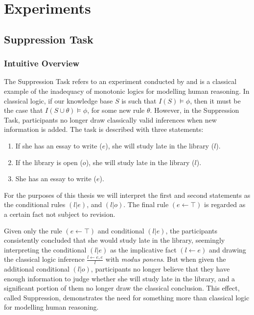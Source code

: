 \chapter{Experiments} \label{chp:experiments}
\section{Suppression Task} \label{sec:sup}
\subsection{Intuitive Overview} \label{ssec:sup_intuition}
The Suppression Task refers to an experiment conducted by \cite{byrne1989suppressing} and is a classical example of the inadequacy of monotonic logics for modelling human reasoning. In classical logic, if our knowledge base $S$ is such that $I(S) \models \phi$, then it must be the case that $I(S \cup \theta) \models \phi$, for some new rule $\theta$. However, in the Suppression Task, participants no longer draw classically valid inferences when new information is added. The task is described with three statements:

\begin{enumerate}
\item If she has an essay to write ($e$), she will study late in the library ($l$).
\item If the library is open ($o$), she will study late in the library ($l$).
\item She has an essay to write ($e$).
\end{enumerate}

For the purposes of this thesis we will interpret the first and second statements as the conditional rules $(l|e)$, and $(l|o)$. The final rule $(e \leftarrow \top)$ is regarded as a certain fact not subject to revision.

Given only the rule $(e\leftarrow \top)$ and conditional $(l|e)$, the participants consistently concluded that she would study late in the library, seemingly interpreting the conditional $(l|e)$ as the implicative fact $(l\leftarrow e)$ and drawing the classical logic inference $\frac{l \leftarrow e, e}{l}$ with \textit{modus ponens}. But when given the additional conditional $(l|o)$, participants no longer believe that they have enough information to judge whether she will study late in the library, and a significant portion of them no longer draw the classical conclusion. This effect, called Suppression, demonstrates the need for something more than classical logic for modelling human reasoning.

